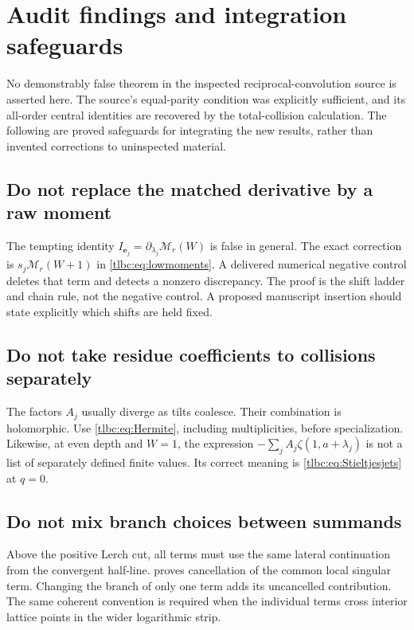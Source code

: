 \documentclass[11pt,letterpaper]{article}
\numberwithin{equation}{section}
\theoremstyle{definition}\newtheorem{definition}[theorem]{Definition}
\theoremstyle{remark}\newtheorem{remark}[theorem]{Remark}
\newcommand{\M}{\mathcal M}\newcommand{\T}{\mathcal T}\newcommand{\K}{\mathcal K}
\begin{document}
\section{Audit findings and integration safeguards}
\label{tlbc:sec:audit}
No demonstrably false theorem in the inspected reciprocal-convolution source is asserted here. The source's equal-parity condition was explicitly sufficient, and its all-order central identities are recovered by the total-collision calculation. The following are proved safeguards for integrating the new results, rather than invented corrections to uninspected material.

\subsection{Do not replace the matched derivative by a raw moment}
The tempting identity $I_{\mathbf e_j}=\partial_{\lambda_j}\M_r(W)$ is false in general. The exact correction is $s_j\M_r(W+1)$ in \eqref{tlbc:eq:lowmoments}. A delivered numerical negative control deletes that term and detects a nonzero discrepancy. The proof is the shift ladder and chain rule, not the negative control. A proposed manuscript insertion should state explicitly which shifts are held fixed.

\subsection{Do not take residue coefficients to collisions separately}
The factors $A_j$ usually diverge as tilts coalesce. Their combination is holomorphic. Use \eqref{tlbc:eq:Hermite}, including multiplicities, before specialization. Likewise, at even depth and $W=1$, the expression $-\sum_jA_j\zeta(1,a+\lambda_j)$ is not a list of separately defined finite values. Its correct meaning is \eqref{tlbc:eq:Stieltjesjets} at $q=0$.

\subsection{Do not mix branch choices between summands}
Above the positive Lerch cut, all terms must use the same lateral continuation from the convergent half-line.  proves cancellation of the common local singular term. Changing the branch of only one term adds its uncancelled contribution. The same coherent convention is required when the individual terms cross interior lattice points in the wider logarithmic strip.
\end{document}
